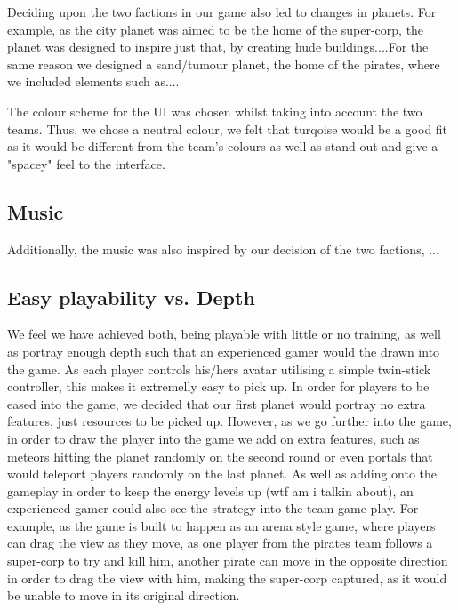 \documentclass[11pt,a4paper]{article}
\begin{document}
        Deciding upon the two factions in our game also led to changes in planets. For example, as the city planet was aimed to be the home of the super-corp, the planet was designed to inspire just that, by creating hude buildings....For the same reason we designed a sand/tumour planet, the home of the pirates, where we included elements such as....

        The colour scheme for the UI was chosen whilst taking into account the two teams. Thus, we chose a neutral colour, we felt that turqoise would be a good fit as it would be different from the team's colours as well as stand out and give a "spacey" feel to the interface.


        \subsection{Music}
        Additionally, the music was also inspired by our decision of the two factions, ...


        \subsection{Easy playability vs. Depth}
        We feel we have achieved both, being playable with little or no training, as well as portray enough depth such that an experienced gamer would the drawn into the game. As each player controls his/hers avatar utilising a simple twin-stick controller, this makes it extremelly easy to pick up. In order for players to be eased into the game, we decided that our first planet would portray no extra features, just resources to be picked up. However, as we go further into the game, in order to draw the player into the game we add on extra features, such as meteors hitting the planet randomly on the second round or even portals that would teleport players randomly on the last planet. As well as adding onto the gameplay in order to keep the energy levels up (wtf am i talkin about), an experienced gamer could also see the strategy into the team game play. For example, as the game is built to happen as an arena style game, where players can drag the view as they move, as one player from the pirates team follows a super-corp to try and kill him, another pirate can move in the opposite direction in order to drag the view with him, making the super-corp captured, as it would be unable to move in its original direction. 
\end{document}
